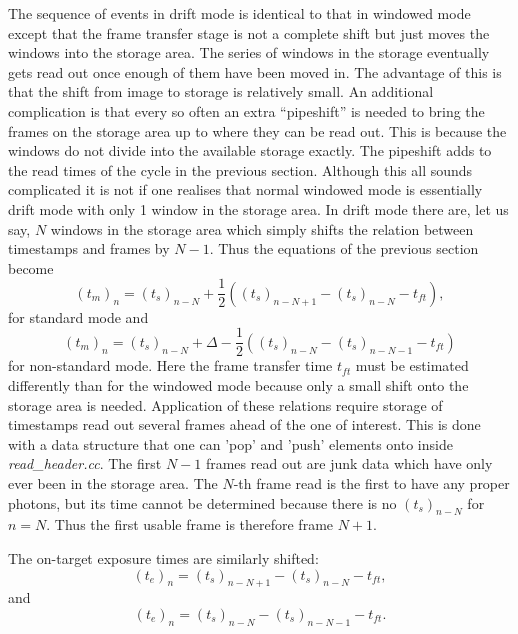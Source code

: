 \documentclass[10pt,a4paper,twocolumn]{article}
\begin{document}
The sequence of events in drift mode is identical to that in windowed
mode except that the frame transfer stage is not a complete shift but
just moves the windows into the storage area. The series of windows in
the storage eventually gets read out once enough of them have been
moved in. The advantage of this is that the shift from image to
storage is relatively small. An additional complication is that every
so often an extra ``pipeshift'' is needed to bring the frames on the
storage area up to where they can be read out. This is because the
windows do not divide into the available storage exactly. The
pipeshift adds to the read times of the cycle in the previous
section. Although this all sounds complicated it is not if one
realises that normal windowed mode is essentially drift mode with only
1 window in the storage area. In drift mode there are, let us say, $N$
windows in the storage area which simply shifts the relation between
timestamps and frames by $N-1$. Thus the equations of the previous
section become
\begin{equation}
(t_m)_n = (t_s)_{n-N} + \frac{1}{2}\left( (t_s)_{n-N+1} - (t_s)_{n-N} -  t_{ft} \right),
\end{equation}
for standard mode and
\begin{equation}
(t_m)_n = (t_s)_{n-N} + \Delta - \frac{1}{2}\left( (t_s)_{n-N} -
  (t_s)_{n-N-1} - t_{ft} \right)
\end{equation} 
for non-standard mode. Here the frame transfer time $t_{ft}$ must be estimated
differently than for the windowed mode because only a small shift onto the
storage area is needed. Application of these relations require storage of
timestamps read out several frames ahead of the one of interest.
This is done with a data structure that one can 'pop' and 'push' 
elements onto inside \emph{read\_header.cc}. The first $N-1$ frames read
out are junk data which have only ever been in the storage area. The
$N$-th frame read is the first to have any proper photons, but its 
time cannot be determined because there is no $(t_s)_{n-N}$ for $n =
N$. Thus the first usable frame is therefore frame $N+1$.

The on-target exposure times are similarly shifted:
\begin{equation}
(t_e)_n = (t_s)_{n-N+1} - (t_s)_{n-N} -  t_{ft},
\end{equation}
and
\begin{equation}
(t_e)_n = (t_s)_{n-N} - (t_s)_{n-N-1} -  t_{ft}.
\end{equation}
\end{document}
